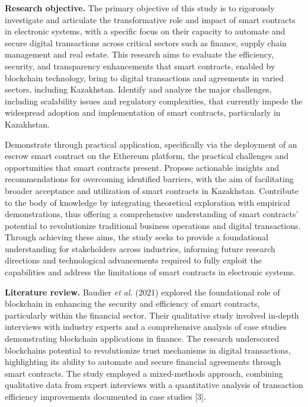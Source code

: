 \textbf{Research objective.} The primary objective of this study is to
rigorously investigate and articulate the transformative role and impact
of smart contracts in electronic systems, with a specific focus on their
capacity to automate and secure digital transactions across critical
sectors such as finance, supply chain management and real estate. This
research aims to evaluate the efficiency, security, and transparency
enhancements that smart contracts, enabled by blockchain technology,
bring to digital transactions and agreements in varied sectors,
including Kazakhstan. Identify and analyze the major challenges,
including scalability issues and regulatory complexities, that currently
impede the widespread adoption and implementation of smart contracts,
particularly in Kazakhstan.

Demonstrate through practical application, specifically via the
deployment of an escrow smart contract on the Ethereum platform, the
practical challenges and opportunities that smart contracts present.
Propose actionable insights and recommendations for overcoming
identified barriers, with the aim of facilitating broader acceptance and
utilization of smart contracts in Kazakhstan. Contribute to the body of
knowledge by integrating theoretical exploration with empirical
demonstrations, thus offering a comprehensive understanding of smart
contracts' potential to revolutionize traditional business operations
and digital transactions. Through achieving these aims, the study seeks
to provide a foundational understanding for stakeholders across
industries, informing future research directions and technological
advancements required to fully exploit the capabilities and address the
limitations of smart contracts in electronic systems.

\textbf{Literature review.} Baudier \emph{et al.} (2021) explored the
foundational role of blockchain in enhancing the security and efficiency
of smart contracts, particularly within the financial sector. Their
qualitative study involved in-depth interviews with industry experts and
a comprehensive analysis of case studies demonstrating blockchain
applications in finance. The research underscored
blockchain\textquotesingle s potential to revolutionize trust mechanisms
in digital transactions, highlighting its ability to automate and secure
financial agreements through smart contracts. The study employed a
mixed-methods approach, combining qualitative data from expert
interviews with a quantitative analysis of transaction efficiency
improvements documented in case studies {[}3{]}.

